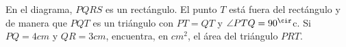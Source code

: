 En el diagrama, $PQRS$ es un rectángulo. El punto $T$ está fuera del rectángulo y de manera que $PQT$ es un triángulo con $PT = QT$ y $\angle PTQ = 90^\cir$c. Si $PQ = 4cm$ y $QR = 3cm$, encuentra, en $cm^2$, el área del triángulo $PRT$.